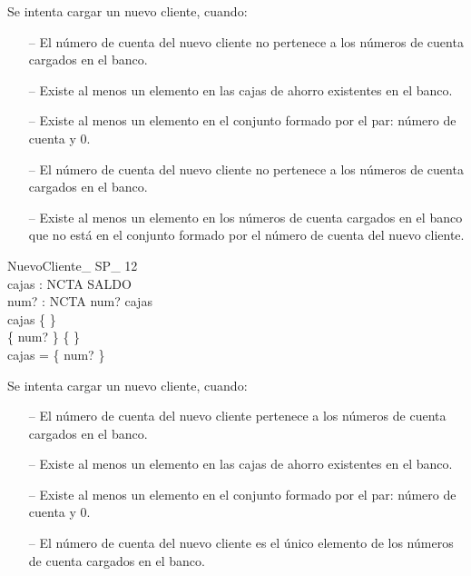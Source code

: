 \begin{tcolorbox}[colback=gray!5!white,colframe=gray!50!black,
  colbacktitle=gray!75!black,title=NuevoCliente\_SP\_8]
  Se intenta cargar un nuevo cliente, cuando:
     \begin{itemize}
        \item[--]{El número de cuenta del nuevo cliente no pertenece a los números de cuenta cargados en el banco.}
        \item[--]{Existe al menos un elemento en las cajas de ahorro existentes en el banco.}
        \item[--]{Existe al menos un elemento en el conjunto formado por el par: número de cuenta y 0.}
        \item[--]{El número de cuenta del nuevo cliente no pertenece a los números de cuenta cargados en el banco.}
        \item[--]{Existe al menos un elemento en los números de cuenta cargados en el banco que no está en el conjunto formado por el número de cuenta del nuevo cliente.}
     \end{itemize}
\end{tcolorbox}


\begin{schema}{NuevoCliente\_ SP\_ 12}\\
 cajas : NCTA \pfun SALDO \\
 num? : NCTA 
\where
 num? \in \dom cajas \\
 cajas \neq \{ \} \\
 \{ num?  \} \neq \{ \} \\
 \dom cajas = \dom \{ num?  \}
\end{schema}


\begin{tcolorbox}[colback=gray!5!white,colframe=gray!50!black,
  colbacktitle=gray!75!black,title=NuevoCliente\_SP\_12]
  Se intenta cargar un nuevo cliente, cuando:
     \begin{itemize}
        \item[--]{El número de cuenta del nuevo cliente pertenece a los números de cuenta cargados en el banco.}
        \item[--]{Existe al menos un elemento en las cajas de ahorro existentes en el banco.}
        \item[--]{Existe al menos un elemento en el conjunto formado por el par: número de cuenta y 0.}
        \item[--]{El número de cuenta del nuevo cliente es el único elemento de los números de cuenta cargados en el banco.}
     \end{itemize}
\end{tcolorbox}


